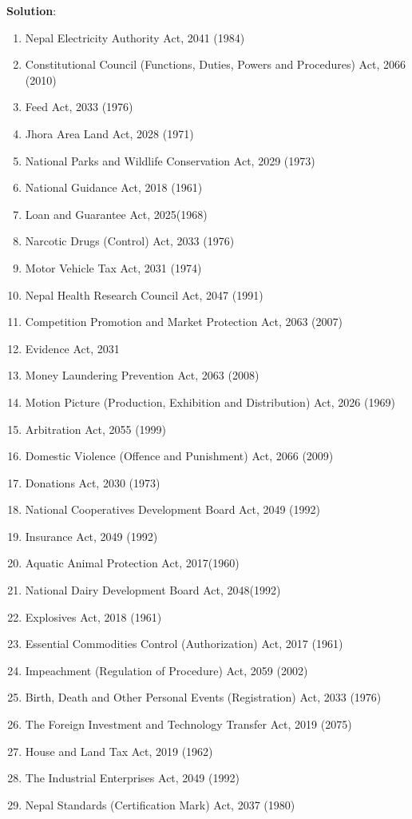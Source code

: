 \documentclass[
  openany]{book}
\newenvironment{solution}{ {\bfseries Solution}:}{}
\begin{document}
\begin{questions}
\begin{solution}
\begin{enumerate}
\item Nepal Electricity Authority Act, 2041 (1984)
\item Constitutional Council (Functions, Duties, Powers and Procedures) Act, 2066 (2010)
\item Feed Act, 2033 (1976)
\item Jhora Area Land Act, 2028 (1971)
\item National Parks and Wildlife Conservation Act, 2029 (1973)
\item National Guidance Act, 2018 (1961)
\item Loan and Guarantee Act, 2025(1968)
\item Narcotic Drugs (Control) Act, 2033 (1976)
\item Motor Vehicle Tax Act, 2031 (1974)
\item Nepal Health Research Council Act, 2047 (1991)
\item Competition Promotion and Market Protection Act, 2063 (2007)
\item Evidence Act, 2031
\item Money Laundering Prevention Act, 2063 (2008)
\item Motion Picture (Production, Exhibition and Distribution) Act, 2026 (1969)
\item Arbitration Act, 2055 (1999)
\item Domestic Violence (Offence and Punishment) Act, 2066 (2009)
\item Donations Act, 2030 (1973)
\item National Cooperatives Development Board Act, 2049 (1992)
\item Insurance Act, 2049 (1992)
\item Aquatic Animal Protection Act, 2017(1960)
\item National Dairy Development Board Act, 2048(1992)
\item Explosives Act, 2018 (1961)
\item Essential Commodities Control (Authorization) Act, 2017 (1961)
\item Impeachment (Regulation of Procedure) Act, 2059 (2002)
\item Birth, Death and Other Personal Events (Registration) Act, 2033 (1976)
\item The Foreign Investment and Technology Transfer Act, 2019 (2075)
\item House and Land Tax Act, 2019 (1962)
\item The Industrial Enterprises Act, 2049 (1992)
\item Nepal Standards (Certification Mark) Act, 2037 (1980)

\end{enumerate}
\end{solution}
\end{questions}
\end{document}
